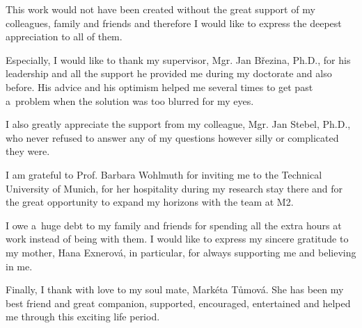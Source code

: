 \documentclass[bibliography=totocnumbered,dvipsnames,FM,Dis,EN]{tulthesis}
\begin{document}
\begin{acknowledgement}
\thispagestyle{empty}
This work would not have been created without the great support of my colleagues, family and friends
and therefore I would like to express the deepest appreciation to all of them.

Especially, I would like to thank my supervisor, Mgr. Jan B{\v r}ezina, Ph.D., for his leadership and all the support he provided me
during my doctorate and also before. His advice and his optimism helped me several times to get past a~problem
when the solution was too blurred for my eyes.

I also greatly appreciate the support from my colleague, Mgr. Jan Stebel, Ph.D.,
who never refused to answer any of my questions however silly or complicated they were.

I am grateful to Prof. Barbara Wohlmuth for inviting me to the Technical University of Munich,
for her hospitality during my research stay there and for the great opportunity to expand my horizons with the team at M2.

I owe a~huge debt to my family and friends for spending all the extra hours at work instead of being with them.
I would like to express my sincere gratitude to my mother, Hana Exnerov\'a, in particular, for always supporting me and believing in me.

Finally, I thank with love to my soul mate, Markéta Tůmová. She has been my best friend and great companion,
supported, encouraged, entertained and helped me through this exciting life period.


% 
% 
% 


\end{acknowledgement}
\end{document}
